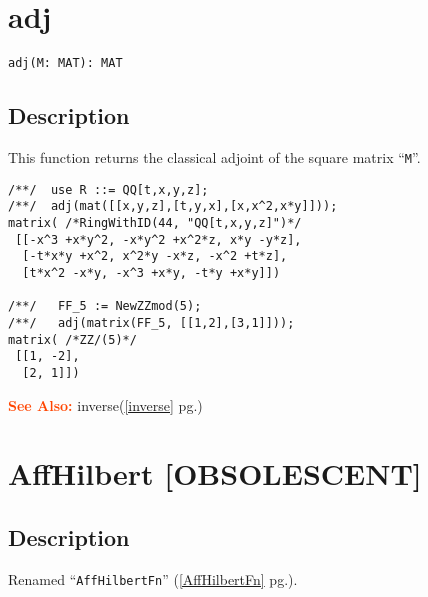 \documentclass[a4paper]{mybook}
\newenvironment{command}{}{} %
\newcommand\SeeAlso{\par\textcolor{OrangeRed}{\textbf{\large See Also: }}}
\begin{document}
\section{adj}
\label{adj}
\begin{command} %


\begin{Verbatim}[label=syntax, rulecolor=\color{MidnightBlue},
frame=single]
adj(M: MAT): MAT
\end{Verbatim}


\subsection*{Description}

This function returns the classical adjoint of the square matrix ``\verb&M&''.
\begin{Verbatim}[label=example, rulecolor=\color{PineGreen}, frame=single]
/**/  use R ::= QQ[t,x,y,z];
/**/  adj(mat([[x,y,z],[t,y,x],[x,x^2,x*y]]));
matrix( /*RingWithID(44, "QQ[t,x,y,z]")*/
 [[-x^3 +x*y^2, -x*y^2 +x^2*z, x*y -y*z],
  [-t*x*y +x^2, x^2*y -x*z, -x^2 +t*z],
  [t*x^2 -x*y, -x^3 +x*y, -t*y +x*y]])

/**/   FF_5 := NewZZmod(5);
/**/   adj(matrix(FF_5, [[1,2],[3,1]]));
matrix( /*ZZ/(5)*/
 [[1, -2],
  [2, 1]])
\end{Verbatim}


\SeeAlso %
  inverse(\ref{inverse} pg.\pageref{inverse})
\end{command} %

\section{AffHilbert [OBSOLESCENT]}
\label{AffHilbert [OBSOLESCENT]}
\begin{command} %



\subsection*{Description}

Renamed ``\verb&AffHilbertFn&'' (\ref{AffHilbertFn} pg.\pageref{AffHilbertFn}).

\end{command} %
\end{document}
